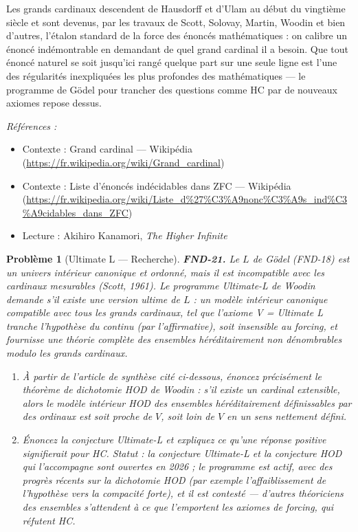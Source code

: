 \documentclass[11pt]{article}
\newtheorem{problem}{Problème}
\newenvironment{refs}{\par\small\noindent\emph{Références :}\begin{itemize}\setlength\itemsep{0pt}}{\end{itemize}\normalsize}
\begin{document}
\noindent Les grands cardinaux descendent de Hausdorff et d'Ulam au début du vingtième
siècle et sont devenus, par les travaux de Scott, Solovay, Martin, Woodin et bien d'autres,
l'étalon standard de la force des énoncés mathématiques : on calibre un énoncé indémontrable en
demandant de quel grand cardinal il a besoin. Que tout énoncé naturel se soit jusqu'ici rangé
quelque part sur une seule ligne est l'une des régularités inexpliquées les plus profondes des
mathématiques --- le programme de Gödel pour trancher des questions comme HC par de nouveaux axiomes
repose dessus.

\begin{refs}
\item Contexte : Grand cardinal --- Wikipédia (\url{https://fr.wikipedia.org/wiki/Grand_cardinal})
\item Contexte : Liste d'énoncés indécidables dans ZFC --- Wikipédia (\url{https://fr.wikipedia.org/wiki/Liste_d%27%C3%A9nonc%C3%A9s_ind%C3%A9cidables_dans_ZFC})
\item Lecture : Akihiro Kanamori, \textit{The Higher Infinite}
\end{refs}

\bigskip

\begin{problem}[{Ultimate L --- Recherche}]
\textbf{FND-21.} Le $ L $ de Gödel (FND-18) est un univers intérieur canonique et ordonné,
mais il est incompatible avec les cardinaux mesurables (Scott, 1961). Le \textit{programme Ultimate-L}
de Woodin demande s'il existe une version \og{} ultime \fg{} de $ L $ : un modèle intérieur canonique
compatible avec tous les grands cardinaux, tel que l'axiome \og{} V = Ultimate L \fg{} tranche
l'hypothèse du continu (par l'affirmative), soit insensible au forcing, et fournisse une théorie
complète des ensembles héréditairement non dénombrables modulo les grands cardinaux.
\begin{enumerate}
\item[(a)] À partir de
l'article de synthèse cité ci-dessous, énoncez précisément le théorème de dichotomie HOD de
Woodin : s'il existe un cardinal extensible, alors le modèle intérieur HOD des ensembles
héréditairement définissables par des ordinaux est soit \og{} proche \fg{} de $ V $, soit \og{} loin \fg{} de
$ V $ en un sens nettement défini.
\item[(b)] Énoncez la conjecture
Ultimate-L et expliquez ce qu'une réponse positive signifierait pour HC. \textit{Statut : la conjecture
Ultimate-L et la conjecture HOD qui l'accompagne sont ouvertes en 2026 ; le programme est actif,
avec des progrès récents sur la dichotomie HOD (par exemple l'affaiblissement de l'hypothèse vers
la compacité forte), et il est contesté --- d'autres théoriciens des ensembles s'attendent à ce que
l'emportent les axiomes de forcing, qui réfutent HC.}
\end{enumerate}

\end{problem}
\end{document}
